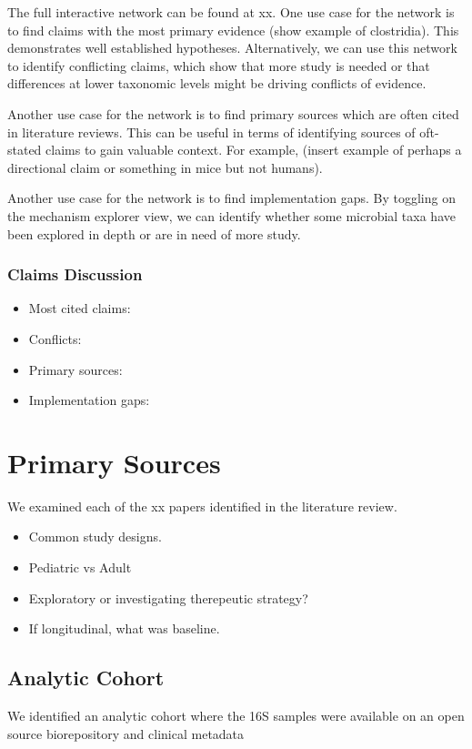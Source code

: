 \documentclass[11pt,a4paper]{article}
\begin{document}
The full interactive network can be found at xx. One use case for the network is to find claims with the most primary evidence (show example of clostridia). This demonstrates well established hypotheses. Alternatively, we can use this network to identify conflicting claims, which show that more study is needed or that differences at lower taxonomic levels might be driving conflicts of evidence. 

Another use case for the network is to find primary sources which are often cited in literature reviews. This can be useful in terms of identifying sources of oft-stated claims to gain valuable context. For example, (insert example of perhaps a directional claim or something in mice but not humans).

Another use case for the network is to find implementation gaps. By toggling on the mechanism explorer view, we can identify whether some microbial taxa have been explored in depth or are in need of more study. 


\subsubsection{Claims Discussion}
\begin{itemize}
    \item Most cited claims:
    \item Conflicts:
    \item Primary sources:
    \item Implementation gaps:
\end{itemize}



\newpage
\section{Primary Sources}
We examined each of the xx papers identified in the literature review.
\begin{itemize}
    \item Common study designs. 
    \item Pediatric vs Adult
    \item Exploratory or investigating therepeutic strategy?
    \item If longitudinal, what was baseline.
\end{itemize}

\subsection{Analytic Cohort}
We identified an analytic cohort where the 16S samples were available on an open source biorepository and clinical metadata
\end{document}
